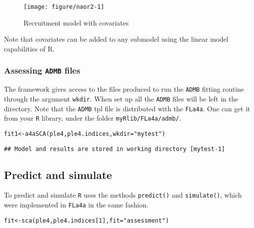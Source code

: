 \documentclass[a4paper,english,10pt]{article}\usepackage[]{graphicx}\usepackage[]{color}
\makeatletter
\def\maxwidth{ %
  \ifdim\Gin@nat@width>\linewidth
    \linewidth
  \else
    \Gin@nat@width
  \fi
}
\newcommand{\hlnum}[1]{\textcolor[rgb]{0.2,0.2,0.2}{#1}}%
\newcommand{\hlstr}[1]{\textcolor[rgb]{0.2,0.2,0.2}{#1}}%
\newcommand{\hlstd}[1]{\textcolor[rgb]{0,0,0}{#1}}%
\newcommand{\hlkwb}[1]{\textcolor[rgb]{0.361,0.506,0.596}{#1}}%
\newcommand{\hlkwc}[1]{\textcolor[rgb]{0.361,0.506,0.596}{#1}}%
\newcommand{\hlkwd}[1]{\textcolor[rgb]{0.361,0.506,0.596}{#1}}%
\newenvironment{kframe}{%
 \def\at@end@of@kframe{}%
 \ifinner\ifhmode%
  \def\at@end@of@kframe{\end{minipage}}%
  \begin{minipage}{\columnwidth}%
 \fi\fi%
 \def\FrameCommand##1{\hskip\@totalleftmargin \hskip-\fboxsep
 \colorbox{shadecolor}{##1}\hskip-\fboxsep
     \hskip-\linewidth \hskip-\@totalleftmargin \hskip\columnwidth}%
 \MakeFramed {\advance\hsize-\width
   \@totalleftmargin\z@ \linewidth\hsize
   \@setminipage}}%
 {\par\unskip\endMakeFramed%
 \at@end@of@kframe}
\newenvironment{knitrout}{}{} %
\newcommand{\code}[1]{{\texttt{#1}}}
\newcommand{\pkg}[1]{{\texttt{#1}}}
\makeatother
\begin{document}
\begin{knitrout}
\color{fgcolor}\begin{figure}[H]

{\centering \texttt{[image: figure/naor2-1]} 

}

\caption[Recruitment model with covariates]{Recruitment model with covariates\label{fig:naor2}}
\end{figure}


\end{knitrout}

Note that covariates can be added to any submodel using the linear model capabilities of R.

\subsubsection{Assessing \pkg{ADMB} files}

The framework gives access to the files produced to run the \pkg{ADMB} fitting routine through the argument \code{wkdir}. When set up all the \pkg{ADMB} files will be left in the directory. Note that the \pkg{ADMB} tpl file is distributed with the \pkg{FLa4a}. One can get it from your \pkg{R} library, under the folder \code{myRlib/FLa4a/admb/}.

\begin{knitrout}
\color{fgcolor}\begin{kframe}
\begin{alltt}
\hlstd{fit1} \hlkwb{<-} \hlkwd{a4aSCA}\hlstd{(ple4, ple4.indices,} \hlkwc{wkdir}\hlstd{=}\hlstr{"mytest"}\hlstd{)}
\end{alltt}
\begin{verbatim}
## Model and results are stored in working directory [mytest-1]
\end{verbatim}
\end{kframe}
\end{knitrout}

\subsection{Predict and simulate}

To predict and simulate \pkg{R} uses the methods \code{predict()} and \code{simulate()}, which were implemented in \pkg{FLa4a} in the same fashion.

\begin{knitrout}
\color{fgcolor}\begin{kframe}
\begin{alltt}
\hlstd{fit} \hlkwb{<-} \hlkwd{sca}\hlstd{(ple4, ple4.indices[}\hlnum{1}\hlstd{],} \hlkwc{fit}\hlstd{=}\hlstr{"assessment"}\hlstd{)}
\end{alltt}
\end{kframe}
\end{knitrout}
\end{document}
